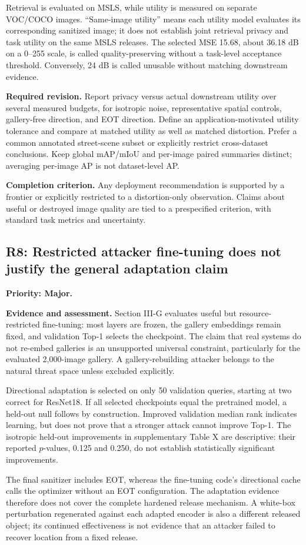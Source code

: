 \documentclass[11pt,a4paper]{article}
\newcommand{\finding}[3]{\subsection{#1: #3}\label{rev:#1}\textbf{Priority: #2.}}
\newcommand{\evidence}{\par\textbf{Evidence and assessment.} }
\newcommand{\action}{\par\textbf{Required revision.} }
\newcommand{\acceptance}{\par\textbf{Completion criterion.} }
\begin{document}
Retrieval is evaluated on MSLS, while utility is measured on separate VOC/COCO images. ``Same-image utility'' means each utility model evaluates its corresponding sanitized image; it does not establish joint retrieval privacy and task utility on the same MSLS releases. The selected MSE 15.68, about 36.18 dB on a 0--255 scale, is called quality-preserving without a task-level acceptance threshold. Conversely, 24 dB is called unusable without matching downstream evidence.

\action
Report privacy versus actual downstream utility over several measured budgets, for isotropic noise, representative spatial controls, gallery-free direction, and EOT direction. Define an application-motivated utility tolerance and compare at matched utility as well as matched distortion. Prefer a common annotated street-scene subset or explicitly restrict cross-dataset conclusions. Keep global mAP/mIoU and per-image paired summaries distinct; averaging per-image AP is not dataset-level AP.
\acceptance
Any deployment recommendation is supported by a frontier or explicitly restricted to a distortion-only observation. Claims about useful or destroyed image quality are tied to a prespecified criterion, with standard task metrics and uncertainty.

\finding{R8}{Major}{Restricted attacker fine-tuning does not justify the general adaptation claim}
\evidence
Section III-G evaluates useful but resource-restricted fine-tuning: most layers are frozen, the gallery embeddings remain fixed, and validation Top-1 selects the checkpoint. The claim that real systems do not re-embed galleries is an unsupported universal constraint, particularly for the evaluated 2,000-image gallery. A gallery-rebuilding attacker belongs to the natural threat space unless excluded explicitly.

Directional adaptation is selected on only 50 validation queries, starting at two correct for ResNet18. If all selected checkpoints equal the pretrained model, a held-out null follows by construction. Improved validation median rank indicates learning, but does not prove that a stronger attack cannot improve Top-1. The isotropic held-out improvements in supplementary Table X are descriptive: their reported $p$-values, 0.125 and 0.250, do not establish statistically significant improvements.

The final sanitizer includes EOT, whereas the fine-tuning code's directional cache calls the optimizer without an EOT configuration. The adaptation evidence therefore does not cover the complete hardened release mechanism. A white-box perturbation regenerated against each adapted encoder is also a different released object; its continued effectiveness is not evidence that an attacker failed to recover location from a fixed release.
\end{document}
